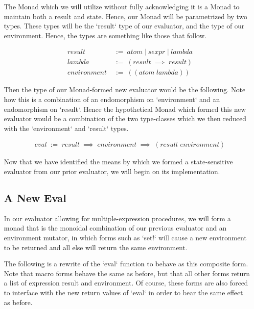 The Monad which we will utilize without fully acknowledging it is a Monad
to maintain both a result and state. Hence, our Monad will be parametrized
by two types. These types will be the `result` type of our evaluator, and the
type of our environment. Hence, the types are something like those that
follow.

\begin{align*}
& result \; &:= \; atom \; | \; sexpr \; | \; lambda
\\& lambda \; &:= \; (result \; \implies \; result)
\\& environment \; &:= \; ((atom \; lambda))
\end{align*}

Then the type of our Monad-formed new evaluator would be the following. Note
how this is a combination of an endomorphism on `environment` and an 
endomorphism on `result`. Hence the hypothetical Monad which formed this new
evaluator would be a combination of the two type-classes which we then
reduced with the `environment` and `result` types.

\begin{align*}
& eval \; := \; result \; \implies \; environment \; \implies \; (result \; environment)
\end{align*}

Now that we have identified the means by which we formed a state-sensitive
evaluator from our prior evaluator, we will begin on its implementation.

\subsection{A New Eval}
In our evaluator allowing for multiple-expression procedures, we will form a 
monad that is the monoidal combination of our previous evaluator and an 
environment mutator, in which forms such as `set!` will cause a new
environment to be returned and all else will return the same environment.

The following is a rewrite of the `eval` function to behave as this composite
form. Note that macro forms behave the same as before, but that all other
forms return a list of expression result and environment. Of course, these
forms are also forced to interface with the new return values of `eval` in
order to bear the same effect as before.

